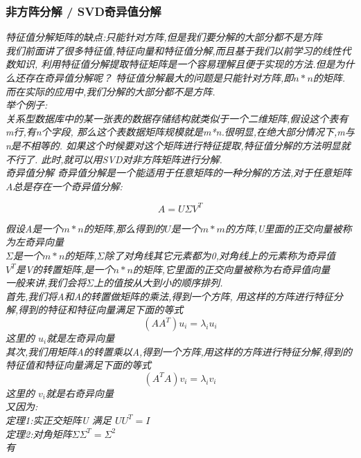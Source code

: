 \documentclass{scrartcl}
\numberwithin{equation}{section}
\begin{document}
\subsubsection{非方阵分解 / SVD奇异值分解}
\textsl{特征值分解矩阵的缺点:只能针对方阵,但是我们要分解的大部分都不是方阵
    \\我们前面讲了很多特征值,特征向量和特征值分解,而且基于我们以前学习的线性代数知识,
    利用特征值分解提取特征矩阵是一个容易理解且便于实现的方法.但是为什么还存在奇异值分解呢？
    特征值分解最大的问题是只能针对方阵,即$n*n$的矩阵.而在实际的应用中,我们分解的大部分都不是方阵.
    \\举个例子:
    \\关系型数据库中的某一张表的数据存储结构就类似于一个二维矩阵,假设这个表有m行,有n个字段,
    那么这个表数据矩阵规模就是m*n.很明显,在绝大部分情况下,m与n是不相等的.
    如果这个时候要对这个矩阵进行特征提取,特征值分解的方法明显就不行了.
    此时,就可以用SVD对非方阵矩阵进行分解.
    \\奇异值分解
    奇异值分解是一个能适用于任意矩阵的一种分解的方法,对于任意矩阵A总是存在一个奇异值分解:
}

\begin{equation}
    A = U \Sigma V^T
\end{equation}

\textsl{假设A是一个$m*n$的矩阵,那么得到的$U$是一个$m*m$的方阵,U里面的正交向量被称为左奇异向量\\
    $\Sigma$是一个$m*n$的矩阵,$\Sigma$除了对角线其它元素都为0,对角线上的元素称为奇异值\\
    $V^T$是V的转置矩阵,是一个$n*n$的矩阵,它里面的正交向量被称为右奇异值向量\\
    一般来讲,我们会将$\Sigma$上的值按从大到小的顺序排列.
    \\首先,我们将A和A的转置做矩阵的乘法,得到一个方阵,
    用这样的方阵进行特征分解,得到的特征和特征向量满足下面的等式
}
\begin{equation}
    (A A^T )u_i= \lambda_i u_i
\end{equation}
\textsl{这里的 $u_i$就是左奇异向量\\其次,我们用矩阵A的转置乘以A,得到一个方阵,用这样的方阵进行特征分解,得到的特征值和特征向量满足下面的等式
}
\begin{equation}
    (A^T A )v_i= \lambda_i v_i
\end{equation}
\textsl{这里的 $v_i$就是右奇异向量\\又因为:
    \\ 定理1:实正交矩阵U 满足  $U U^T =I$
    \\ 定理2:对角矩阵$\Sigma \Sigma^T = \Sigma^2$
    \\ 有
}
\end{document}

